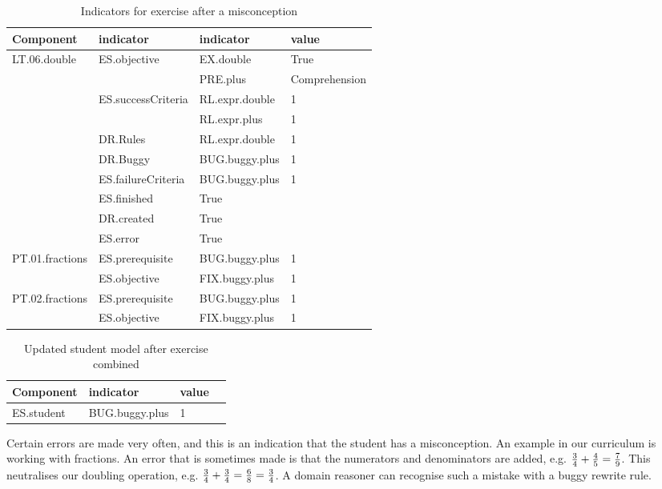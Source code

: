 \label{sec:misconcept}
\begin{table}[H]
\begin{tabular}{| l | l | l | l |}
\hline
Component & indicator & indicator & value\\
\hline

LT.06.double & ES.objective &EX.double & True\\
 & & PRE.plus &Comprehension\\
 & ES.successCriteria &RL.expr.double & 1\\
 & & RL.expr.plus &1\\
& DR.Rules & RL.expr.double & 1 \\
& DR.Buggy & BUG.buggy.plus & 1\\
& ES.failureCriteria & BUG.buggy.plus  & 1\\
& ES.finished & True & \\
& DR.created & True & \\
& ES.error & True& \\
PT.01.fractions & ES.prerequisite & BUG.buggy.plus & 1\\
 & ES.objective & FIX.buggy.plus & 1 \\
PT.02.fractions & ES.prerequisite & BUG.buggy.plus & 1\\
 & ES.objective & FIX.buggy.plus & 1 \\

\hline
\end{tabular}
\caption{Indicators for exercise after a misconception}
\label{double.buggy.ex}
\end{table}

\begin{table}[H]
\begin{tabular}{| l | l | l | l}
\hline
Component & indicator & value\\
\hline
ES.student & BUG.buggy.plus & 1\\
\hline
\end{tabular}
\caption{Updated student model after exercise combined}
\label{double.buggy.student}
\end{table}


Certain errors are made very often, and this is an indication that the student has a misconception.
An example in our curriculum is working with fractions.
An error that is sometimes made is that the numerators and denominators are added, e.g. ${3\over 4} + {4 \over 5}  = {7 \over 9}$.
This neutralises our doubling operation, e.g.  ${3\over 4} + {3 \over 4}  = {6 \over 8} = {3 \over 4}$.
A domain reasoner can recognise such a mistake with a buggy rewrite rule.

